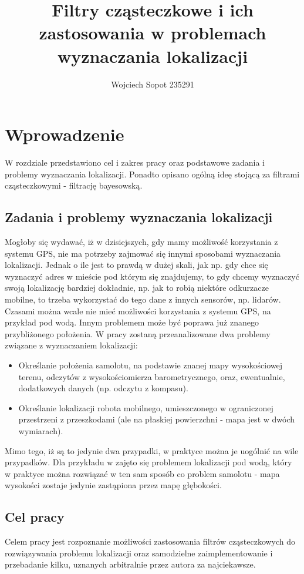 \documentclass[10pt,a4paper]{article}
\author{Wojciech Sopot 235291}
\title{Filtry cząsteczkowe i ich zastosowania w problemach wyznaczania lokalizacji}
\begin{document}
\maketitle
\tableofcontents
\newpage
\section{Wprowadzenie}W rozdziale przedstawiono cel i zakres pracy oraz podstawowe zadania i problemy wyznaczania lokalizacji. Ponadto opisano ogólną ideę stojącą za filtrami cząsteczkowymi - filtrację bayesowską. 
\subsection{Zadania i problemy wyznaczania lokalizacji}
Mogłoby się wydawać, iż w dzisiejszych, gdy mamy możliwość korzystania z systemu GPS, nie ma potrzeby zajmować się innymi sposobami wyznaczania lokalizacji. Jednak o ile jest to prawdą w dużej skali, jak np. gdy chce się wyznaczyć adres w mieście pod którym się znajdujemy, to gdy chcemy wyznaczyć swoją lokalizację bardziej dokładnie, np. jak to robią niektóre odkurzacze mobilne, to trzeba wykorzystać do tego dane z innych sensorów, np. lidarów. Czasami można wcale nie mieć możliwości korzystania z systemu GPS, na przykład pod wodą. Innym problemem może być poprawa już znanego przybliżonego położenia. W pracy zostaną przeanalizowane dwa problemy związane z wyznaczaniem lokalizacji:
\begin{itemize}
	\item Określanie położenia samolotu, na podstawie znanej mapy wysokościowej terenu, odczytów z wysokościomierza barometrycznego, oraz, ewentualnie, dodatkowych danych (np. odczytu z kompasu). 
	\item Określanie lokalizacji robota mobilnego, umieszczonego w ograniczonej przestrzeni z przeszkodami (ale na płaskiej powierzchni - mapa jest w dwóch wymiarach).
\end{itemize}
Mimo tego, iż są to jedynie dwa przypadki, w praktyce można je uogólnić na wile przypadków. Dla przykładu w \cite{underwater_pf} zajęto się problemem lokalizacji pod wodą, który w praktyce można rozwiązać w ten sam sposób co problem samolotu - mapa wysokości zostaje jedynie zastąpiona przez mapę głębokości.
\subsection{Cel pracy}
Celem pracy jest rozpoznanie możliwości zastosowania filtrów cząsteczkowych do rozwiązywania problemu lokalizacji oraz samodzielne zaimplementowanie i przebadanie kilku, uznanych arbitralnie przez autora za najciekawsze.
\end{document}
